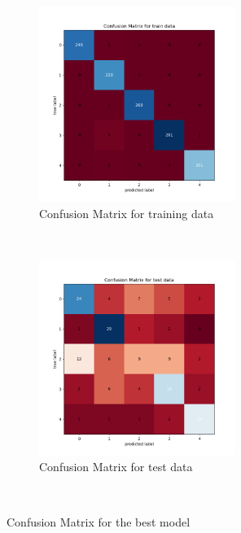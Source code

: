 
\begin{figure}[!ht]
    \centering
    \begin{subfigure}[t]{0.5\textwidth}
        \centering
        \includegraphics[height=2.5in]{Dataset_2a/dataset_2a_cmatrix_train_data_svc.png}
        \caption{Confusion Matrix for training data}
    \end{subfigure}%
    ~ 
    \begin{subfigure}[t]{0.5\textwidth}
        \centering
        \includegraphics[height=2.5in]{Dataset_2a/dataset_2a_cmatrix_test_data_svc.png}
        \caption{Confusion Matrix for test data}
    \end{subfigure}%
    ~
    \caption{Confusion Matrix for the best model}
    \label{fig:13}
\end{figure}

